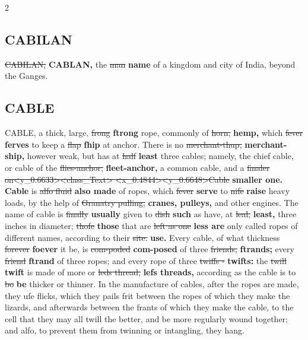 \documentclass[10pt]{article}
\begin{document}
\begin{multicols}{2}
\subsection*{CABILAN}
\sout{CABILAN,} \textbf{CABLAN,} the \sout{man} \textbf{name} of a kingdom and city of India, beyond the Ganges.

\subsection*{CABLE}
CABLE, a thick, large, \sout{frong} \textbf{ftrong} rope, commonly of \sout{horn,} \textbf{hemp,} which \sout{fever} \textbf{ferves} to keep a \sout{flap} \textbf{fhip} at anchor. There is no \sout{merchant-thup,} \textbf{merchant-ship,} however weak, but has at \sout{half} \textbf{least} three cables; namely, the chief cable, or cable of the \sout{flies-anchor,} \textbf{fleet-anchor,} a common cable, and a \sout{finaler on<y\_0.6633><class\_Text> <x\_0.4844><y\_0.6648>Cable} \textbf{smaller one. Cable} is \sout{alfo fluid} \textbf{also made} of ropes, which \sout{fever} \textbf{serve} to \sout{nife} \textbf{raise} heavy loads, by the help of \sout{Granatry pulling,} \textbf{cranes, pulleys,} and other engines. The name of cable is \sout{finally} \textbf{usually} given to \sout{dish} \textbf{such} as have, at \sout{leal,} \textbf{least,} three inches in diameter; \sout{thofe} \textbf{those} that are \sout{left as one} \textbf{less are} only called ropes of different names, according to their \sout{site.} \textbf{use.} Every cable, of what thickness \sout{forever} \textbf{foever} it be, is \sout{com-poded} \textbf{com-posed} of three \sout{friends,} \textbf{ftrands;} every \sout{friend} \textbf{ftrand} of three ropes; and every rope of three \sout{twiffs -} \textbf{twifts:} the \sout{twill} \textbf{twift} is made of more or \sout{leds thread,} \textbf{lefs threads,} according as the cable is to \sout{bo} \textbf{be} thicker or thinner. In the manufacture of cables, after the ropes are made, they ufe flicks, which they pails frit between the ropes of which they make the lizards, and afterwards between the frants of which they make the cable, to the cell that they may all twill the better, and be more regularly wound together; and alfo, to prevent them from twinning or intangling, they hang.
\end{multicols}
\end{document}
